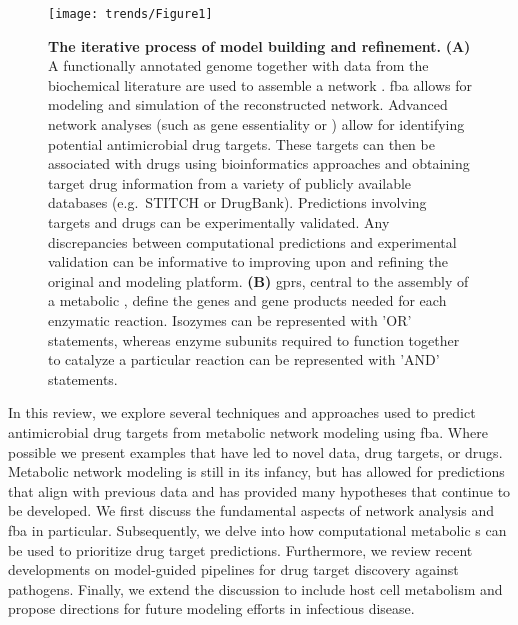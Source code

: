 \begin{figure}[t!]
  \centering
  \texttt{[image: trends/Figure1]}
  \caption[The iterative process of model building and refinement]{
       \textbf{The iterative process of model building and refinement.}
       \textbf{(A)} A 
       functionally annotated genome together with data from the 
       biochemical literature are used to assemble a network 
       . \gls{fba} allows for 
       modeling and simulation of the reconstructed network. 
       Advanced network analyses (such as gene essentiality or 
       ) allow for identifying potential 
       antimicrobial drug targets. These targets can then be 
       associated with drugs using bioinformatics approaches 
       and obtaining target drug information from a variety 
       of publicly available databases (e.g.\ STITCH or DrugBank). 
       Predictions involving targets and drugs can be experimentally 
       validated. Any discrepancies between computational 
       predictions and experimental validation can be informative 
       to improving upon and refining the original  
       and modeling platform. \textbf{(B)} \glspl{gpr}, 
       central to the assembly of a metabolic 
       , define the genes and gene products needed 
       for each enzymatic reaction. Isozymes can be represented 
       with 'OR' statements, whereas enzyme subunits required 
       to function together to catalyze a particular reaction 
       can be represented with 'AND' statements.
  }
  \label{trends:fig1}
\end{figure}



In this review, we explore several techniques and approaches 
used to predict antimicrobial drug targets from metabolic network 
modeling using \gls{fba}. Where possible we present examples that have 
led to novel data, drug targets, or drugs. Metabolic network 
modeling is still in its infancy, but has allowed for predictions 
that align with previous data and has provided many hypotheses 
that continue to be developed. We first discuss the fundamental 
aspects of network analysis and \gls{fba} in particular. Subsequently, 
we delve into how computational metabolic s can be 
used to prioritize drug target predictions. Furthermore, we 
review recent developments on model-guided pipelines for drug 
target discovery against pathogens. Finally, we extend the discussion 
to include host cell metabolism and propose directions for future 
modeling efforts in infectious disease.


